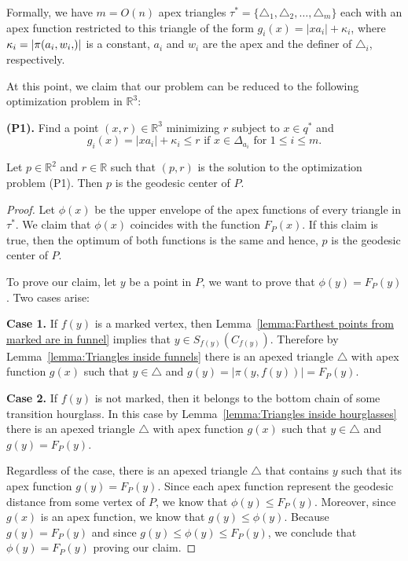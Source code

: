 \documentclass[a4paper,UKenglish]{lipics}
\newcommand{\F}[2]{\ensuremath{F_{\scriptscriptstyle #1}(#2)}}
\newcommand{\fn}[2]{\ensuremath{S_{\scriptscriptstyle #1}(#2)}}
\newcommand{\ff}[1]{\ensuremath{f(#1)}}
\newcommand{\g}[2]{\ensuremath{|\pi(#1, #2)|}}
\begin{document}
Formally, we have $m = O(n)$ apex triangles $\tau^* = \{\triangle_{1}, \triangle_{2}, \ldots, \triangle_{m}\}$ each with an apex function restricted to this triangle of the form $g_i(x) = |x a_i| + \kappa_i$, where $\kappa_i = \g{a_i, w_i}$ is a constant, $a_i$ and $w_i$ are the apex and the definer of $\triangle_i$, respectively.

At this point, we claim that our problem can be reduced to the following optimization problem in $\mathbb{R}^3$:

\textbf{(P1).} Find a point $(x,r)\in \mathbb{R}^3$ minimizing $r$ subject to $x\in q^*$ and
$$\text{$g_i(x) = |x a_i| + \kappa_i \leq r$ if $x\in \Delta_{a_i}$ for $1\leq i \leq m$}.$$

\begin{lemma}\label{lemma:Optimization problem same as geodesic center}
Let $p\in \mathbb{R}^2$ and $r\in \mathbb{R}$ such that $(p,r)$ is the solution to the optimization problem (P1). Then $p$ is the geodesic center of $P$.
\end{lemma}
\begin{proof}
Let $\phi(x)$ be the upper envelope of the apex functions of every triangle in $\tau^*$.
We claim that $\phi(x)$ coincides with the function $\F{P}{x}$.
If this claim is true, then the optimum of both functions is the same and hence, $p$ is the geodesic center of $P$.

To prove our claim, let $y$ be a point in $P$, we want to prove that $\phi(y) = \F{P}{y}$. 
Two cases arise: 

\textbf{Case 1.} If $\ff{y}$ is a marked vertex, then Lemma~\ref{lemma:Farthest points from marked are in funnel} implies that $y\in \fn{\ff{y}}{C_{\ff{y}}}$. Therefore
by Lemma~\ref{lemma:Triangles inside funnels} there is an apexed triangle $\triangle$ with apex function $g(x)$ such that $y\in \triangle$ and $g(y) = \g{y}{\ff{y}} = \F{P}{y}$.

\textbf{Case 2.} If $\ff{y}$ is not marked, then it belongs to the bottom chain of some transition hourglass. In this case by Lemma~\ref{lemma:Triangles inside hourglasses} there is an apexed triangle $\triangle$ with apex function $g(x)$ such that $y\in \triangle$ and $g(y) = \F{P}{y}$.

Regardless of the case, there is an apexed triangle $\triangle$ that contains $y$ such that its apex function $g(y) = \F{P}{y}$.
Since each apex function represent the geodesic distance from some vertex of $P$, we know that $\phi(y) \leq \F{P}{y}$. Moreover, since $g(x)$ is an apex function, we know that $g(y) \leq \phi(y)$.
Because $g(y) = \F{P}{y}$ and since $g(y) \leq \phi(y) \leq  \F{P}{y}$, we conclude that $\phi(y) = \F{P}{y}$ proving our claim.
\end{proof}
\end{document}
